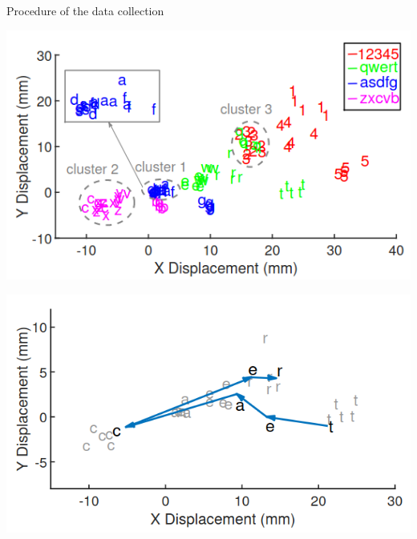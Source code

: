 \documentclass[ucs,9pt,usenames,dvipsnames]{beamer}
\begin{document}
\begin{frame}{Procedure of the data collection}
\begin{minipage}[c]{0.49\linewidth}
	\includegraphics[width=\textwidth]{imgs/displacement}
\end{minipage}
\begin{minipage}[c]{0.49\linewidth}
	\includegraphics[width=\textwidth]{imgs/displacement2}

\end{minipage}
\end{frame}
\end{document}
